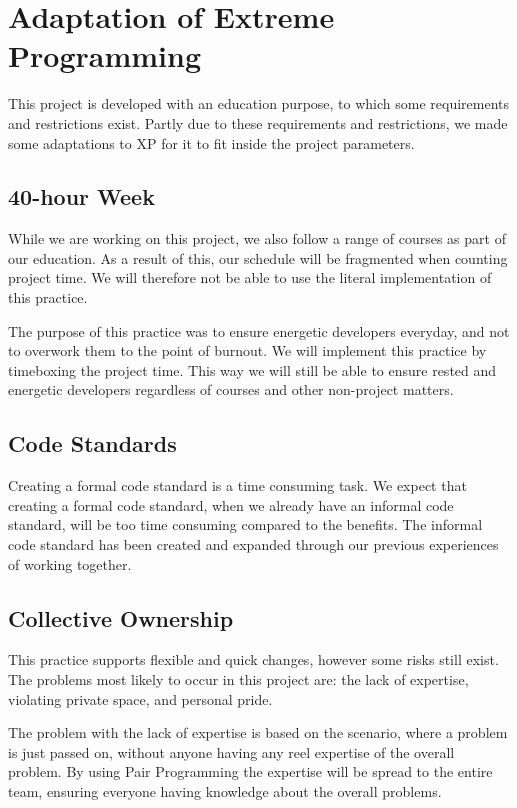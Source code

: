 \section{Adaptation of Extreme Programming}
This project is developed with an education purpose, to which some requirements and restrictions exist.
Partly due to these requirements and restrictions, we made some adaptations to XP for it to fit inside the project parameters.

\subsection{40-hour Week}
While we are working on this project, we also follow a range of courses as part of our education.
As a result of this, our schedule will be fragmented when counting project time.
We will therefore not be able to use the literal implementation of this practice.

The purpose of this practice was to ensure energetic developers everyday, and not to overwork them to the point of burnout.
We will implement this practice by timeboxing the project time.
This way we will still be able to ensure rested and energetic developers regardless of courses and other non-project matters.

\subsection{Code Standards}
Creating a formal code standard is a time consuming task.
We expect that creating a formal code standard, when we already have an informal code standard, will be too time consuming compared to the benefits.
The informal code standard has been created and expanded through our previous experiences of working together.

\subsection{Collective Ownership}
This practice supports flexible and quick changes, however some risks still exist.
The problems most likely to occur in this project are: the lack of expertise, violating private space, and personal pride.

The problem with the lack of expertise is based on the scenario, where a problem is just passed on, without anyone having any reel expertise of the overall problem.
By using Pair Programming the expertise will be spread to the entire team, ensuring everyone having knowledge about the overall problems.

